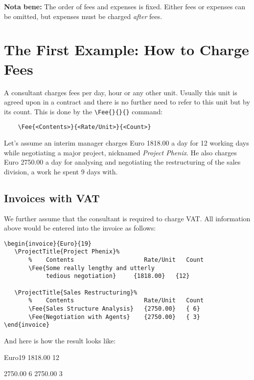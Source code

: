 \documentclass[11pt]{ltxdoc}
\begin{document}
\textbf{Nota bene:} The order of fees and expenses is fixed. Either fees or
expenses can be omitted, but expenses must be charged \textit{after}
fees.


\section{The First Example: How to Charge Fees}


A consultant charges fees per day, hour or any other unit. Usually
this unit is agreed upon in a contract and there is no further need
to refer to this unit but by its count. This is done by the
\verb-\Fee{}{}{}- command:

\begin{verbatim}
	\Fee{<Contents>}{<Rate/Unit>}{<Count>}
\end{verbatim}

Let's assume an interim manager
charges Euro 1818.00 a day for 12 working days while
negotiating a major project, nicknamed \textit{Project Phenix}.
He also charges Euro 2750.00 a day for analysing and negotiating
the restructuring of the sales division, a work he spent 9 days with.

\subsection{Invoices with VAT}

We further assume that the consultant is required to charge VAT.
All information above would be entered into the invoice as follows:

\begin{verbatim}
\begin{invoice}{Euro}{19}
   \ProjectTitle{Project Phenix}%
       %    Contents                    Rate/Unit   Count
       \Fee{Some really lengthy and utterly
       		tedious negotiation}     {1818.00}   {12}

   \ProjectTitle{Sales Restructuring}%
       %    Contents                    Rate/Unit   Count
       \Fee{Sales Structure Analysis}   {2750.00}   { 6}
       \Fee{Negotiation with Agents}    {2750.00}   { 3}
\end{invoice}
\end{verbatim}

And here is how the result looks like:

\begin{invoice}{Euro}{19}
		{1818.00}	{12}

           {2750.00}   { 6}
            {2750.00}   { 3}
\end{invoice}
\end{document}
